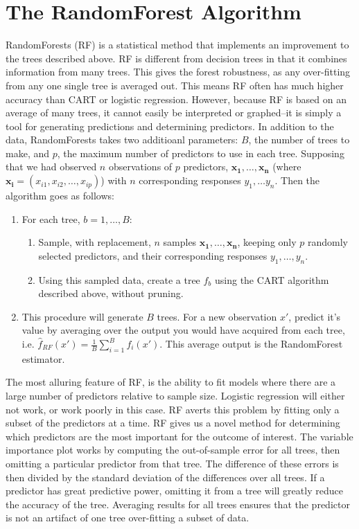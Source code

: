 \documentclass[11pt]{article}
\begin{document}
\section*{The RandomForest Algorithm}
RandomForests (RF) \cite{breiman2001random} is a statistical method that implements an improvement to the trees described above. RF is different from decision trees in that it combines information from many trees. This gives the forest robustness, as any over-fitting from any one single tree is averaged out. This means RF often has much higher accuracy than CART or logistic regression. However, because RF is based on an average of many trees, it cannot easily be interpreted or graphed--it is simply a tool for generating predictions and determining predictors.
In addition to the data, RandomForests takes two additioanl parameters: $B$, the number of trees to make, and $p$, the maximum number of predictors to use in each tree. Supposing that we had observed $n$ observations of $p$ predictors, $\mathbf{x_1}, \dots, \mathbf{x_n}$ (where $\mathbf{x_i} = (x_{i1}, x_{i2}, \dots, x_{ip})$) with $n$ corresponding responses $y_1, \dots y_n$. Then the algorithm goes as follows:
\begin{enumerate}
\item For each tree, $b = 1, \dots, B$:
	\begin{enumerate}
	\item Sample, with replacement, $n$ samples $\mathbf{x_{1}}, \dots, \mathbf{x_{n}}$, keeping only $p$ randomly selected predictors, and their corresponding responses $y_1, \dots, y_n$.
	\item Using this sampled data, create a tree $f_b$ using the CART algorithm described above, without pruning.
	\end{enumerate}
\item This procedure will generate $B$ trees. For a new observation $x'$, predict it's value by averaging over the output you would have acquired from each tree, i.e. $\hat{f}_{RF} (x') = \frac{1}{B} \sum_{i=1}^B f_i (x')$. This average output is the RandomForest estimator.
\end{enumerate}

The most alluring feature of RF, is the ability to fit models where there are a large number of predictors relative to sample size. Logistic regression will either not work, or work poorly in this case. RF averts this problem by fitting only a subset of the predictors at a time. RF gives us a novel method for determining which predictors are the most important for the outcome of interest. The variable importance plot works by computing the out-of-sample error for all trees, then omitting a particular predictor from that tree. The difference of these errors is then divided by the standard deviation of the differences over all trees. If a predictor has great predictive power, omitting it from a tree will greatly reduce the accuracy of the tree. Averaging results for all trees ensures that the predictor is not an artifact of one tree over-fitting a subset of data.
\end{document}
